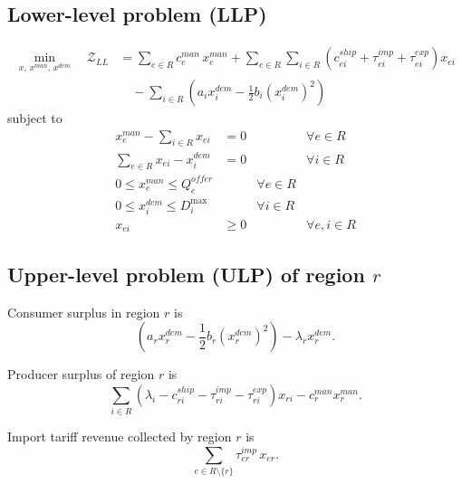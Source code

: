 \documentclass[11pt,a4paper]{article}
\begin{document}
\subsection{Lower-level problem (LLP)}
\begin{align}
\min_{x,\,x^{man},\,x^{dem}} \quad
\mathcal{Z}_{LL}
&=
\sum_{e\in R} c_e^{man}\,x_e^{man}
+
\sum_{e\in R}\sum_{i\in R}
\left(
c_{ei}^{ship}+\tau_{ei}^{imp}+\tau_{ei}^{exp}
\right)x_{ei}
\nonumber\\
&\quad
-
\sum_{i\in R}
\left(
a_i x_i^{dem}-\frac12 b_i (x_i^{dem})^2
\right)
\label{eq:llp_obj}
\end{align}
subject to
\begin{align}
x_e^{man}-\sum_{i\in R}x_{ei} &= 0
&& \forall e\in R
\label{eq:llp_prod_balance}
\\
\sum_{e\in R}x_{ei}-x_i^{dem} &= 0
&& \forall i\in R
\label{eq:llp_dem_balance}
\\
0 \le x_e^{man} \le Q_e^{offer}
&& \forall e\in R
\label{eq:llp_prod_bound}
\\
0 \le x_i^{dem} \le D_i^{\max}
&& \forall i\in R
\label{eq:llp_dem_bound}
\\
x_{ei} &\ge 0
&& \forall e,i\in R
\label{eq:llp_flow_nonneg}
\end{align}

\subsection{Upper-level problem (ULP) of region \(r\)}

Consumer surplus in region \(r\) is
\[
\left(
a_r x_r^{dem}-\frac12 b_r (x_r^{dem})^2
\right)-\lambda_r x_r^{dem}.
\]

Producer surplus of region \(r\) is
\[
\sum_{i\in R}
\left(
\lambda_i-c_{ri}^{ship}-\tau_{ri}^{imp}-\tau_{ri}^{exp}
\right)x_{ri}
-c_r^{man}x_r^{man}.
\]

Import tariff revenue collected by region \(r\) is
\[
\sum_{e\in R\setminus\{r\}}\tau_{er}^{imp}\,x_{er}.
\]
\end{document}
